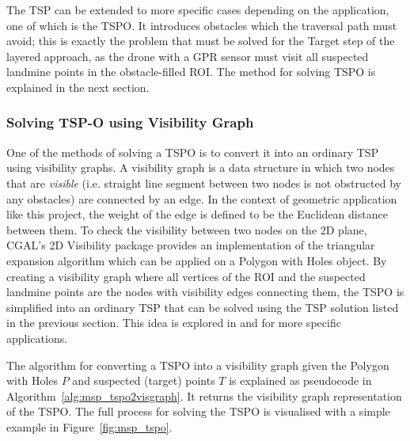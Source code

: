 The \gls{TSP} can be extended to more specific cases depending on the application, one of which is the \gls{TSPO}. It introduces obstacles which the traversal path must avoid; this is exactly the problem that must be solved for the Target step of the layered approach, as the drone with a \gls{GPR} sensor must visit all suspected landmine points in the obstacle-filled \gls{ROI}. The method for solving \gls{TSPO} is explained in the next section. 

\subsubsection{Solving TSP-O using Visibility Graph}

One of the methods of solving a \gls{TSPO} is to convert it into an ordinary \gls{TSP} using visibility graphs. A visibility graph is a data structure in which two nodes that are \textit{visible} (i.e. straight line segment between two nodes is not obstructed by any obstacles) are connected by an edge. In the context of geometric application like this project, the weight of the edge is defined to be the Euclidean distance between them. To check the visibility between two nodes on the 2D plane, \gls{CGAL}'s 2D Visibility package \cite{cgal2024visibility} provides an implementation of the triangular expansion algorithm which can be applied on a Polygon with Holes object. By creating a visibility graph where all vertices of the \gls{ROI} and the suspected landmine points are the nodes with visibility edges connecting them, the \gls{TSPO} is simplified into an ordinary \gls{TSP} that can be solved using the \gls{TSP} solution listed in the previous section. This idea is explored in \cite{barb2024tspo} and \cite{bhat2024tspo} for more specific applications. 

The algorithm for converting a \gls{TSPO} into a visibility graph given the Polygon with Holes $P$ and suspected (target) points $T$ is explained as pseudocode in Algorithm~\ref{alg:msp_tspo2visgraph}. It returns the visibility graph representation of the \gls{TSPO}. The full process for solving the \gls{TSPO} is visualised with a simple example in Figure~\ref{fig:msp_tspo}.

